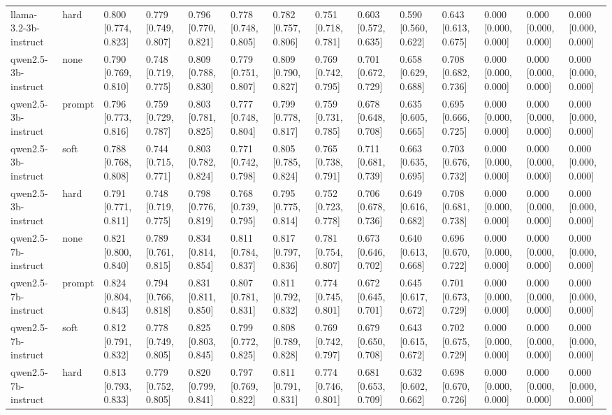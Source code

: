 \begin{tabular}{llllllllllllll}
llama-3.2-3b-instruct & hard & 0.800 [0.774, 0.823] & 0.779 [0.749, 0.807] & 0.796 [0.770, 0.821] & 0.778 [0.748, 0.805] & 0.782 [0.757, 0.806] & 0.751 [0.718, 0.781] & 0.603 [0.572, 0.635] & 0.590 [0.560, 0.622] & 0.643 [0.613, 0.675] & 0.000 [0.000, 0.000] & 0.000 [0.000, 0.000] & 0.000 [0.000, 0.000] \\
qwen2.5-3b-instruct & none & 0.790 [0.769, 0.810] & 0.748 [0.719, 0.775] & 0.809 [0.788, 0.830] & 0.779 [0.751, 0.807] & 0.809 [0.790, 0.827] & 0.769 [0.742, 0.795] & 0.701 [0.672, 0.729] & 0.658 [0.629, 0.688] & 0.708 [0.682, 0.736] & 0.000 [0.000, 0.000] & 0.000 [0.000, 0.000] & 0.000 [0.000, 0.000] \\
qwen2.5-3b-instruct & prompt & 0.796 [0.773, 0.816] & 0.759 [0.729, 0.787] & 0.803 [0.781, 0.825] & 0.777 [0.748, 0.804] & 0.799 [0.778, 0.817] & 0.759 [0.731, 0.785] & 0.678 [0.648, 0.708] & 0.635 [0.605, 0.665] & 0.695 [0.666, 0.725] & 0.000 [0.000, 0.000] & 0.000 [0.000, 0.000] & 0.000 [0.000, 0.000] \\
qwen2.5-3b-instruct & soft & 0.788 [0.768, 0.808] & 0.744 [0.715, 0.771] & 0.803 [0.782, 0.824] & 0.771 [0.742, 0.798] & 0.805 [0.785, 0.824] & 0.765 [0.738, 0.791] & 0.711 [0.681, 0.739] & 0.663 [0.635, 0.695] & 0.703 [0.676, 0.732] & 0.000 [0.000, 0.000] & 0.000 [0.000, 0.000] & 0.000 [0.000, 0.000] \\
qwen2.5-3b-instruct & hard & 0.791 [0.771, 0.811] & 0.748 [0.719, 0.775] & 0.798 [0.776, 0.819] & 0.768 [0.739, 0.795] & 0.795 [0.775, 0.814] & 0.752 [0.723, 0.778] & 0.706 [0.678, 0.736] & 0.649 [0.616, 0.682] & 0.708 [0.681, 0.738] & 0.000 [0.000, 0.000] & 0.000 [0.000, 0.000] & 0.000 [0.000, 0.000] \\
qwen2.5-7b-instruct & none & 0.821 [0.800, 0.840] & 0.789 [0.761, 0.815] & 0.834 [0.814, 0.854] & 0.811 [0.784, 0.837] & 0.817 [0.797, 0.836] & 0.781 [0.754, 0.807] & 0.673 [0.646, 0.702] & 0.640 [0.613, 0.668] & 0.696 [0.670, 0.722] & 0.000 [0.000, 0.000] & 0.000 [0.000, 0.000] & 0.000 [0.000, 0.000] \\
qwen2.5-7b-instruct & prompt & 0.824 [0.804, 0.843] & 0.794 [0.766, 0.818] & 0.831 [0.811, 0.850] & 0.807 [0.781, 0.831] & 0.811 [0.792, 0.832] & 0.774 [0.745, 0.801] & 0.672 [0.645, 0.701] & 0.645 [0.617, 0.672] & 0.701 [0.673, 0.729] & 0.000 [0.000, 0.000] & 0.000 [0.000, 0.000] & 0.000 [0.000, 0.000] \\
qwen2.5-7b-instruct & soft & 0.812 [0.791, 0.832] & 0.778 [0.749, 0.805] & 0.825 [0.803, 0.845] & 0.799 [0.772, 0.825] & 0.808 [0.789, 0.828] & 0.769 [0.742, 0.797] & 0.679 [0.650, 0.708] & 0.643 [0.615, 0.672] & 0.702 [0.675, 0.729] & 0.000 [0.000, 0.000] & 0.000 [0.000, 0.000] & 0.000 [0.000, 0.000] \\
qwen2.5-7b-instruct & hard & 0.813 [0.793, 0.833] & 0.779 [0.752, 0.805] & 0.820 [0.799, 0.841] & 0.797 [0.769, 0.822] & 0.811 [0.791, 0.831] & 0.774 [0.746, 0.801] & 0.681 [0.653, 0.709] & 0.632 [0.602, 0.662] & 0.698 [0.670, 0.726] & 0.000 [0.000, 0.000] & 0.000 [0.000, 0.000] & 0.000 [0.000, 0.000] \\
\bottomrule
\end{tabular}
